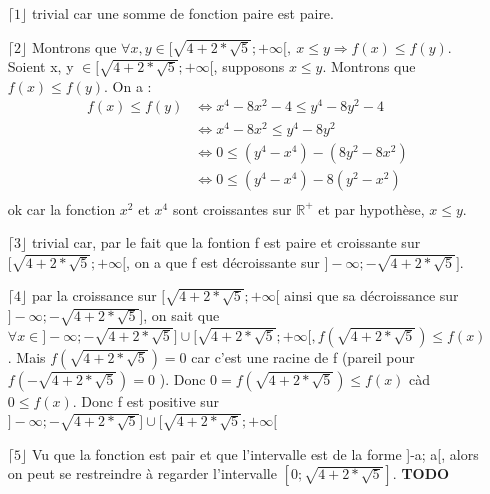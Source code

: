 \documentclass[a4paper, 12pt]{article}
\begin{document}
\begin{itemize}
	\item[\(\lceil 1 \rfloor\)] trivial car une somme de fonction paire est paire.
	\item[\(\lceil 2 \rfloor\)] Montrons que \( \forall x, y \in [ \sqrt{4 + 2 * \sqrt{5}} ; +\infty [, ~ x \leq y \Rightarrow f(x) \leq f(y) \). \newline
	Soient x, y \( \in [ \sqrt{4 + 2 * \sqrt{5}} ; +\infty [ \), supposons \( x \leq y \). Montrons que \( f(x) \leq f(y) \). \newline On a :
	\begin{align*}
		f(x) \leq f(y) &\Leftrightarrow x^4 - 8x^2 - 4 \leq y^4 - 8y^2 - 4 \\
		&\Leftrightarrow x^4 - 8x^2 \leq y^4 - 8y^2 \\
		&\Leftrightarrow 0 \leq (y^4 - x^4) - (8y^2 - 8x^2) \\
		&\Leftrightarrow 0 \leq (y^4 - x^4) - 8(y^2 - x^2) \\
	\end{align*}
	ok car la fonction \( x^2 \) et \( x^4 \) sont croissantes sur \( \mathbb{R}^{+} \) et par hypothèse, \( x \leq y \).	 
	\item[\(\lceil 3 \rfloor\)] trivial car, par le fait que la fontion f est paire et croissante sur \( [ \sqrt{4 + 2 * \sqrt{5}} ; +\infty [ \), on a que f est décroissante sur \( ] -\infty ; -\sqrt{4 + 2 * \sqrt{5}} ] \).
	\item[\(\lceil 4 \rfloor\)] par la croissance sur \( [ \sqrt{4 + 2 * \sqrt{5}} ; +\infty [ \) ainsi que sa décroissance sur \( ] -\infty ; -\sqrt{4 + 2 * \sqrt{5}} ] \), on sait que \( \forall x \in ] -\infty ; -\sqrt{4 + 2 * \sqrt{5}} ] \cup [ \sqrt{4 + 2 * \sqrt{5}} ; +\infty [, f \left( \sqrt{4 + 2 * \sqrt{5}}\right) \leq f \left( x \right) \). Mais \( f \left( \sqrt{4 + 2 * \sqrt{5}} \right) = 0 \) car c'est une racine de f (pareil pour \( f \left( - \sqrt{4 + 2 * \sqrt{5}} \right) = 0 \) ). \newline
	Donc \( 0 = f \left( \sqrt{4 + 2 * \sqrt{5}} \right) \leq f \left( x \right) \) càd \( 0 \leq f \left( x \right) \). Donc f est positive sur \( ] -\infty ; -\sqrt{4 + 2 * \sqrt{5}} ] \cup [ \sqrt{4 + 2 * \sqrt{5}} ; +\infty [ \)
	\item[\(\lceil 5 \rfloor\)] Vu que la fonction est pair et que l'intervalle est de la forme ]-a; a[, alors on peut se restreindre à regarder l'intervalle \( [ 0 ; \sqrt{4 + 2 * \sqrt{5}} ] \).
	\newline \textbf{TODO}
	
\end{itemize}
\end{document}
